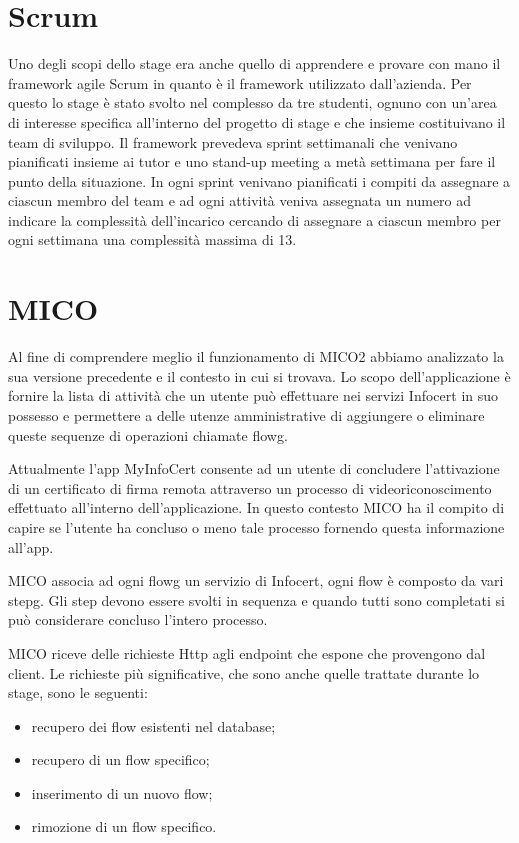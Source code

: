 \section{Scrum}
Uno degli scopi dello stage era anche quello di apprendere e provare con mano il framework agile Scrum in quanto è il framework utilizzato dall'azienda.
Per questo lo stage è stato svolto nel complesso da tre studenti, ognuno con un'area di interesse specifica all'interno del progetto di stage e che insieme costituivano il team di sviluppo.
Il framework prevedeva sprint settimanali che venivano pianificati insieme ai tutor e uno stand-up meeting a metà settimana per fare il punto della situazione.
In ogni sprint venivano pianificati i compiti da assegnare a ciascun membro del team e ad ogni attività veniva assegnata un numero ad indicare la complessità dell'incarico cercando di assegnare a ciascun membro per ogni settimana una complessità massima di 13. 

\section{MICO}
Al fine di comprendere meglio il funzionamento di MICO2 abbiamo analizzato la sua versione precedente e il contesto in cui si trovava.
Lo scopo dell'applicazione è fornire la lista di attività che un utente può effettuare nei servizi Infocert in suo possesso e permettere a delle utenze amministrative di aggiungere o eliminare queste sequenze di operazioni chiamate \gls{flowg}.

Attualmente l'app MyInfoCert consente ad un utente di concludere l'attivazione di un certificato di firma remota attraverso un processo di videoriconoscimento effettuato all'interno dell'applicazione. 
In questo contesto MICO ha il compito di capire se l'utente ha concluso o meno tale processo fornendo questa informazione all'app.

MICO associa ad ogni \gls{flowg} un servizio di Infocert, ogni flow è composto da vari \gls{stepg}.
Gli step devono essere svolti in sequenza e quando tutti sono completati si può considerare concluso l'intero processo.

MICO riceve delle richieste Http agli endpoint che espone che provengono dal client.
Le richieste più significative, che sono anche quelle trattate durante lo stage, sono le seguenti:
\begin{itemize}
    \item recupero dei flow esistenti nel database;
    \item recupero di un flow specifico;
    \item inserimento di un nuovo flow;
    \item rimozione di un flow specifico.
\end{itemize}

